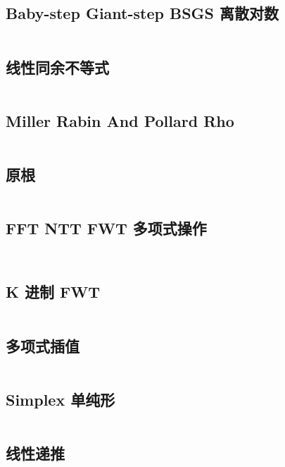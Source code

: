 \documentclass[titlepage, a4paper]{article}
\begin{document}
\begin{multicols}{2}
\begin{spacing}{0.6}
				\subsection{Baby-step Giant-step BSGS 离散对数}
				\inputminted{cpp}{src/Math/BSGS.cpp}
				\subsection{线性同余不等式}
				\inputminted{cpp}{src/Math/线性同余不等式.cpp}
				\subsection{Miller Rabin And Pollard Rho}
				\inputminted{cpp}{src/Math/Miller Rabin And Pollard Rho.cpp}
				
				\subsection{原根}
				\inputminted{cpp}{src/Math/原根.cpp}
				\subsection{FFT NTT FWT 多项式操作}
				\inputminted{cpp}{src/Math/FFT NTT FWT.cpp}
				
				\inputminted{cpp}{src/Math/Polynomial.cpp}
				
				\subsection{K 进制 FWT}
				\inputminted{cpp}{src/tbr/fwt.cpp}
				\subsection{多项式插值}
				\inputminted{cpp}{src/Math/插值.cpp}
				\subsection{Simplex 单纯形}
				\inputminted{cpp}{src/Math/Simplex.cpp}
				\subsection{线性递推}
				\inputminted{cpp}{src/Math/线性递推.cpp}

\end{spacing}
\end{multicols}
\end{document}
